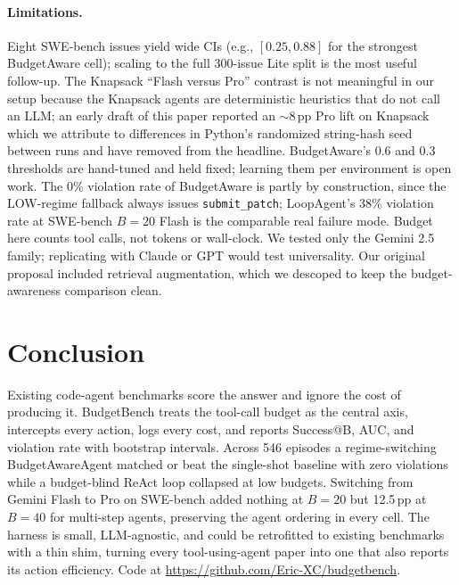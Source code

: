 \documentclass[journal=jacsat,manuscript=article]{achemso}
\begin{document}
\paragraph{Limitations.}
Eight SWE-bench issues yield wide CIs (e.g., $[0.25, 0.88]$ for the
strongest BudgetAware cell); scaling to the full 300-issue Lite split
is the most useful follow-up. The Knapsack ``Flash versus Pro''
contrast is not meaningful in our setup because the Knapsack agents
are deterministic heuristics that do not call an LLM; an early draft
of this paper reported an $\sim$8\,pp Pro lift on Knapsack which we
attribute to differences in Python's randomized string-hash seed
between runs and have removed from the headline. BudgetAware's 0.6
and 0.3 thresholds are hand-tuned and held fixed; learning them per
environment is open work. The 0\% violation rate of BudgetAware is
partly by construction, since the LOW-regime fallback always issues
\texttt{submit\_patch}; LoopAgent's 38\% violation rate at SWE-bench
$B{=}20$ Flash is the comparable real failure mode. Budget here
counts tool calls, not tokens or wall-clock. We tested only the
Gemini 2.5 family; replicating with Claude or GPT would test
universality. Our original proposal included retrieval augmentation,
which we descoped to keep the budget-awareness comparison clean.

\section{Conclusion}

Existing code-agent benchmarks score the answer and ignore the cost
of producing it. BudgetBench treats the tool-call budget as the
central axis, intercepts every action, logs every cost, and reports
Success@B, AUC, and violation rate with bootstrap intervals. Across
546 episodes a regime-switching BudgetAwareAgent matched or beat the
single-shot baseline with zero violations while a budget-blind
ReAct loop collapsed at low budgets. Switching from Gemini Flash to
Pro on SWE-bench added nothing at $B = 20$ but 12.5\,pp at $B = 40$
for multi-step agents, preserving the agent ordering in every cell. The harness is small, LLM-agnostic, and
could be retrofitted to existing benchmarks with a thin shim,
turning every tool-using-agent paper into one that also reports its
action efficiency. Code at
\url{https://github.com/Eric-XC/budgetbench}.

\clearpage


\end{document}
